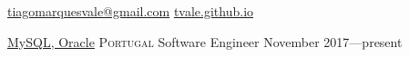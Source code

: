 \documentclass[10pt,a4paper]{article}
\begin{document}
\sloppy  %



\nobreakvspace{0.3em}  %

\noindent\href{mailto:tiagomarquesvale@gmail.com}{tiagomarquesvale\mbox{}@\mbox{}gmail.com}\sbull
\href{http://tvale.github.io}{tvale.github.io}

\spacedhrule{0.9em}{-0.4em}  %

%
%
%
%
%


\headedsection
  {\href{https://oracle.com}{MySQL, Oracle}}
  {\textsc{Portugal}} {%
  \headedsubsection
    {Software Engineer }
    {November 2017---present}
    {}
}
\end{document}
